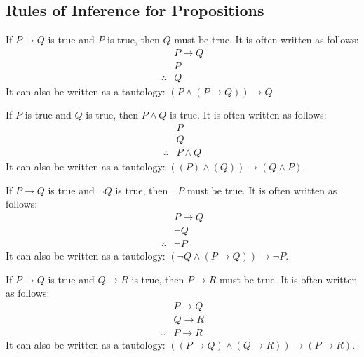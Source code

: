 \subsection{Rules of Inference for Propositions}
\begin{definition}
    If $P \to Q$ is true and $P$ is true, then $Q$ must be true. It is often written as follows:
    \[
        \begin{array}{rl}
            & P \to Q \\
            & P \\
            \hline
            \therefore & Q
        \end{array}
    \]
    It can also be written as a tautology: $(P \land (P \to Q)) \to Q$.
\end{definition}

\begin{definition}[Conjunction]
    If $P$ is true and $Q$ is true, then $P \land Q$ is true. It is often written as follows:
    \[
        \begin{array}{rl}
            & P \\
            & Q \\
            \hline
            \therefore & P \land Q
        \end{array}
    \]
    It can also be written as a tautology: $((P) \land (Q)) \to (Q \land P)$.
\end{definition}

\begin{definition}
    If $P \to Q$ is true and $\neg Q$ is true, then $\neg P$ must be true. It is often written as follows:
    \[
        \begin{array}{rl}
            & P \to Q \\
            & \neg Q \\
            \hline
            \therefore & \neg P
        \end{array}
    \]
    It can also be written as a tautology: $(\neg Q \land (P \to Q)) \to \neg P$.
\end{definition}

\begin{definition}
    If $P \to Q$ is true and $Q \to R$ is true, then $P \to R$ must be true. It is often written as follows:
    \[
        \begin{array}{rl}
            & P \to Q \\
            & Q \to R \\
            \hline
            \therefore & P \to R
        \end{array}
    \]
    It can also be written as a tautology: $((P \to Q) \land (Q \to R)) \to (P \to R)$.
\end{definition}

